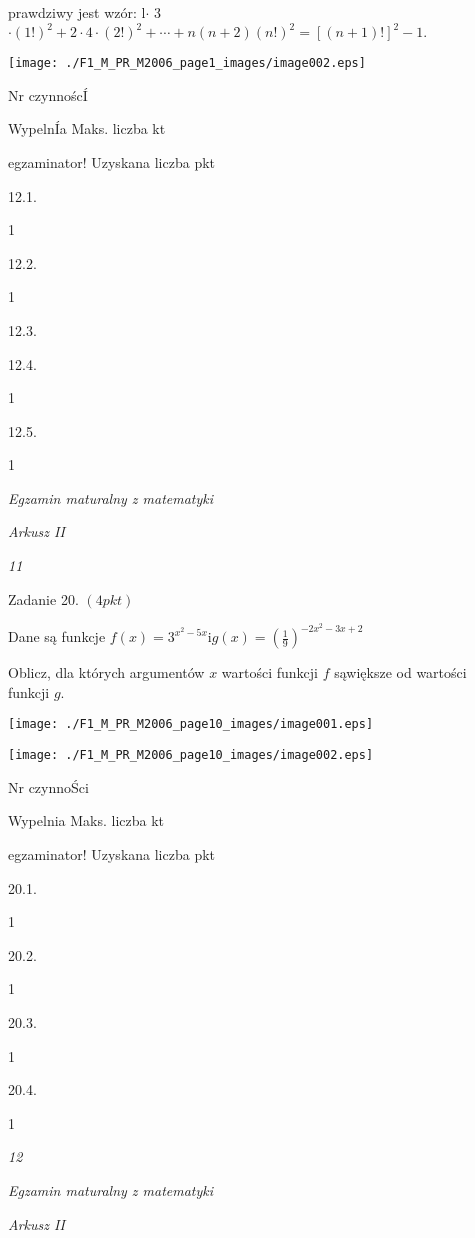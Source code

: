 \documentclass[a4paper,12pt]{article}
\begin{document}
prawdziwy jest wzór: l$\cdot$ 3$\cdot(1!)^{2}+2\cdot 4\cdot(2!)^{2}+\cdots+n(n+2)(n!)^{2}=[(n+1)!]^{2}-1.$
\begin{center}
\texttt{[image: ./F1\_M\_PR\_M2006\_page1\_images/image002.eps]}
\end{center}
Nr czynnoścÍ

WypelnÍa Maks. liczba kt

egzaminator! Uzyskana liczba pkt

12.1.

1

12.2.

1

12.3.

12.4.

1

12.5.

1





{\it Egzamin maturalny z matematyki}

{\it Arkusz II}

{\it 11}

Zadanie 20. $(4pkt)$

Dane są funkcje $f(x)=3^{x^{2}-5x} \mathrm{i} g(x)=(\displaystyle \frac{1}{9})^{-2x^{2}-3x+2}$

Oblicz, dla których argumentów $x$ wartości funkcji $f$ sąwiększe od wartości funkcji $g.$
\begin{center}
\texttt{[image: ./F1\_M\_PR\_M2006\_page10\_images/image001.eps]}

\texttt{[image: ./F1\_M\_PR\_M2006\_page10\_images/image002.eps]}
\end{center}
Nr czynnoŚci

Wypelnia Maks. liczba kt

egzaminator! Uzyskana liczba pkt

20.1.

1

20.2.

1

20.3.

1

20.4.

1





{\it 12}

{\it Egzamin maturalny z matematyki}

{\it Arkusz II}
\end{document}
